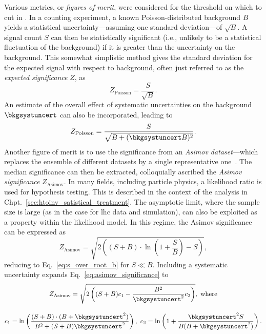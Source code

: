 Various metrics, or \emph{figures of merit}, were considered for the threshold on which to cut in \omegaTilde. In a counting experiment, a known Poisson-distributed background $B$ yields a statistical uncertainty---assuming one standard deviation---of $\sqrt{B}$. A signal count $S$ can then be statistically significant (i.e., unlikely to be a statistical fluctuation of the background) if it is greater than the uncertainty on the background. This somewhat simplistic method gives the standard deviation for the expected signal with respect to background, often just referred to as the \emph{expected significance} $Z$, as
\begin{equation}
Z_{\mathrm{Poisson}} = \frac{S}{\sqrt{B}}.
\label{eq:s_over_root_b}
\end{equation}
An estimate of the overall effect of systematic uncertainties on the background $\bkgsystuncert$ can also be incorporated, leading to
\begin{equation}
Z_{\mathrm{Poisson}} = \frac{S}{\sqrt{B + (\bkgsystuncert B)^2}}.
\label{eq:s_over_root_b_systs}
\end{equation}
Another figure of merit is to use the significance from an \emph{Asimov dataset}---which replaces the ensemble of different datasets by a single representative one~\cite{Cowan:2010js}. The median significance can then be extracted, colloquially ascribed the \emph{Asimov significance} $Z_{\mathrm{Asimov}}$. In many fields, including particle physics, a likelihood ratio is used for hypothesis testing. This is described in the context of the analysis in Chpt.~\ref{sec:htoinv_satistical_treatment}. The asymptotic limit, where the sample size is large (as in the case for \acrshort{lhc} data and simulation), can also be exploited as a property within the likelihood model. In this regime, the Asimov significance can be expressed as
\begin{equation}
Z_{\mathrm{Asimov}} = \sqrt{2 \left( (S + B) \cdot \ln\left(1 + \frac{S}{B} \right) - S \right)},
\label{eq:asimov_significance}
\end{equation}
reducing to Eq.~\ref{eq:s_over_root_b} for $S \ll B$. Including a systematic uncertainty expands Eq.~\ref{eq:asimov_significance} to
\begin{equation}
    \begin{gathered}  %
Z_{\mathrm{Asimov}} = \sqrt{2 \left( (S + B) c_1 - \frac{B^2}{\bkgsystuncert^2}c_2 \right)}, \ \text{where} \\[1em]
c_1 = \ln\left( \frac{(S + B) \cdot (B + \bkgsystuncert^2)}{B^2 + (S + B)\bkgsystuncert^2} \right), \ c_2 = \ln\left( 1 + \frac{\bkgsystuncert^2 S}{B(B + \bkgsystuncert^2)} \right).
    \end{gathered}
\label{eq:asimov_significance_systs}
\end{equation}

